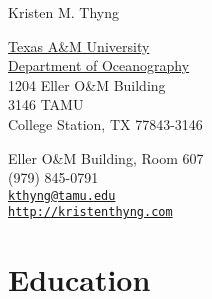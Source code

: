 \documentclass[10pt,letterpaper]{article}
\def\name{Kristen M. Thyng}
\begin{document}


{\huge \name}


\vspace{0.25in}

\begin{minipage}[t]{0.5\textwidth}
  \href{http://www.tamu.edu/}{Texas A\&M University} \\
  \href{http://ocean.tamu.edu/}{Department of Oceanography} \\
  1204 Eller O\&M Building \\
  3146 TAMU \\
  College Station, TX 77843-3146 \\
\end{minipage}
\begin{minipage}[t]{0.5\textwidth}
  Eller O\&M Building, Room 607 \\
  (979) 845-0791 \\
  \href{mailto:kthyng@tamu.edu}{\tt kthyng@tamu.edu} \\
  \href{http://kristenthyng.com}{\tt http://kristenthyng.com} \\
\end{minipage}

\section*{Education}
\end{document}
